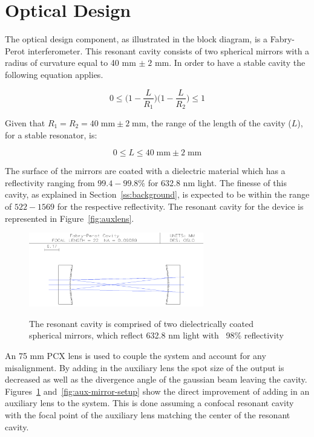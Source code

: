 \documentclass[12pt,journal]{IEEEtran}
\begin{document}

\section{Optical Design} \label{ss:optical_design}
The optical design component, as illustrated in the block diagram, is a Fabry-Perot interferometer. This resonant cavity consists of two spherical mirrors with a radius of curvature equal to 40 mm $\pm\;2$ mm. In order to have a stable cavity the following equation applies.

\begin{equation}
0 \leq \Big(1-\frac{L}{R_1}\Big)\Big(1-\frac{L}{R_2}\Big) \leq 1
\label{eq:unsolved_stability}
\end{equation}

Given that $R_1 = R_2 = 40\;\text{mm} \pm2\;\text{mm}$, the range of the length of the cavity ($L$), for a stable resonator, is:

\begin{equation}
0 \leq L \leq 40\;\text{mm} \pm 2\;\text{mm}
\label{eq:cavity_stability}
\end{equation}

The surface of the mirrors are coated with a dielectric material which has a reflectivity ranging from $99.4-99.8\%$ for 632.8 nm light. The finesse of this cavity, as explained in Section~\ref{ss:background}, is expected to be within the range of $522 - 1569$ for the respective reflectivity.  The resonant cavity for the device is represented in Figure~\ref{fig:auxlens}. 

\begin{figure}[h!]
  \centering
	\includegraphics[width=3in]{./cavity/resonant_cavity.png}\\
	\caption[Resonant Cavity Setup]{The resonant cavity is comprised of two dielectrically coated spherical mirrors, which reflect 632.8 nm light with ~98\% reflectivity}
	\label{fig:mirror-setup}
\end{figure}

An 75 mm PCX lens is used to couple the system and account for any misalignment. By adding in the auxiliary lens the spot size of the output is decreased as well as the divergence angle of the gaussian beam leaving the cavity. Figures~\ref{fig:mirror-setup} and~\ref{fig:aux-mirror-setup} show the direct improvement of adding in an auxiliary lens to the system. This is done assuming a confocal resonant cavity with the focal point of the auxiliary lens matching the center of the resonant cavity.
\end{document}
